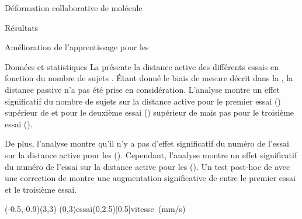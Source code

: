 \documentclass[myfrancais,ngerman,english,frenchb]{mythesis}
\begin{document}
\begin{mychapter}{Déformation collaborative de molécule}
\begin{mysection}{Résultats}
\begin{mysubsection}{Amélioration de l'apprentissage pour les }
\begin{mysubsubsection}{Données et statistiques}
					La  présente la distance active  des différents essais  en fonction du nombre de sujets .
					Étant donné le biais de mesure décrit dans la , la distance passive n'a pas été prise en considération.
					L'analyse montre un effet significatif du nombre de sujets  sur la distance active  pour le premier essai () supérieur de  et pour le deuxième essai () supérieur de  mais pas pour le troisième essai ().

					De plus, l'analyse montre qu'il n'y a pas d'effet significatif du numéro de l'essai  sur la distance active  pour les  ().
					Cependant, l'analyse montre un effet significatif du numéro de l'essai  sur la distance active  pour les  ().
					Un test post-hoc de  avec une correction de  montre une augmentation significative de  entre le premier essai et le troisième essai.

					\begin{myfigure}
						\begin{myps}(-0.5,-0.9)(3,3)
							\myaxes(0,3){essai}(0,2.5)[0.5]{vitesse~(mm/s)}
						\end{myps}
					\end{myfigure}


\end{mysubsubsection}
\end{mysubsection}
\end{mysection}
\end{mychapter}
\end{document}
